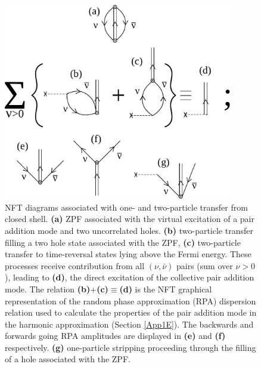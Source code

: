 \begin{figure}[h!]
\centerline {
\includegraphics*[width=10cm]{nutshell/figs/fig2_1_5}
}
\caption{NFT diagrams associated with one- and two-particle transfer from closed shell. \textbf{(a)} ZPF associated with the virtual excitation of a pair addition mode and two uncorrelated holes. \textbf{(b)} two-particle transfer filling a two hole state associated with the ZPF, \textbf{(c)} two-particle transfer to time-reversal states lying above the Fermi energy. These processes receive contribution from all $(\nu,\bar\nu)$ pairs (sum over $\nu>0$), leading to \textbf{(d)}, the direct excitation of the collective pair addition mode. The relation \textbf{(b)}+\textbf{(c)}$\equiv$\textbf{(d)} is the NFT graphical representation of the random phase approximation (RPA) dispersion relation used to calculate the properties of the pair addition mode in the harmonic approximation (Section \ref{App1E}). The backwards and forwards going RPA amplitudes are displayed in  \textbf{(e)} and \textbf{(f)} respectively. \textbf{(g)} one-particle stripping proceeding through the filling of a hole associated with the ZPF.}
\label{fig2.1.5}
\end{figure}

